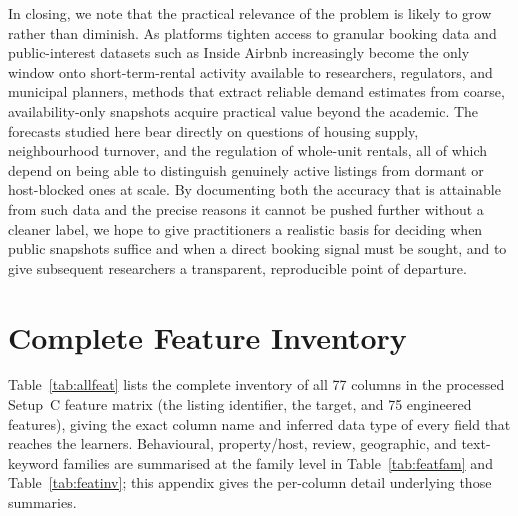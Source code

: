 \documentclass[review,12pt]{elsarticle}
\begin{document}
In closing, we note that the practical relevance of the problem is likely to grow
rather than diminish. As platforms tighten access to granular booking data and
public-interest datasets such as Inside Airbnb increasingly become the only
window onto short-term-rental activity available to researchers, regulators, and
municipal planners, methods that extract reliable demand estimates from coarse,
availability-only snapshots acquire practical value beyond the academic. The
forecasts studied here bear directly on questions of housing supply, neighbourhood
turnover, and the regulation of whole-unit rentals, all of which depend on being
able to distinguish genuinely active listings from dormant or host-blocked ones at
scale. By documenting both the accuracy that is attainable from such data and the
precise reasons it cannot be pushed further without a cleaner label, we hope to give
practitioners a realistic basis for deciding when public snapshots suffice and when
a direct booking signal must be sought, and to give subsequent researchers a
transparent, reproducible point of departure.
\appendix
\section{Complete Feature Inventory}
\label{sec:appendixA}
Table~\ref{tab:allfeat} lists the complete inventory of all 77 columns in the
processed Setup~C feature matrix (the listing identifier, the target, and 75
engineered features), giving the exact column name and inferred data type of
every field that reaches the learners. Behavioural, property/host, review,
geographic, and text-keyword families are summarised at the family level in
Table~\ref{tab:featfam} and Table~\ref{tab:featinv}; this appendix gives the
per-column detail underlying those summaries.
\end{document}
